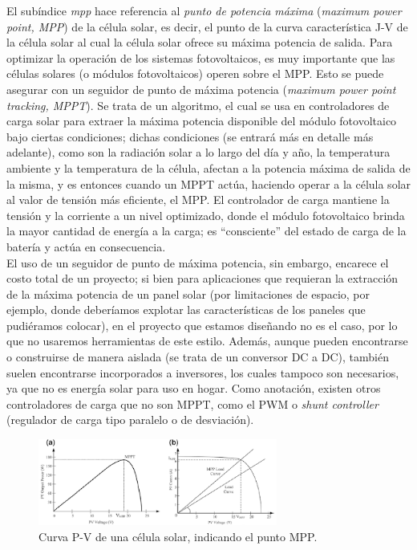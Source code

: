 \documentclass[12pt]{article}
\begin{document}
	\noindent El subíndice \textit{mpp} hace referencia al \textit{punto de potencia máxima} (\textit{maximum power point, MPP}) de la célula solar, es decir, el punto de la curva característica J-V de la célula solar al cual la célula solar ofrece su máxima potencia de salida.  Para optimizar la operación de los sistemas fotovoltaicos, es muy importante que las células solares (o módulos fotovoltaicos) operen sobre el MPP. Esto se puede asegurar con un seguidor de punto de máxima potencia (\textit{maximum power point tracking, MPPT}). Se trata de un algoritmo, el cual se usa en controladores de carga solar para extraer la máxima potencia disponible del módulo fotovoltaico bajo ciertas condiciones; dichas condiciones (se entrará más en detalle más adelante), como son la radiación solar a lo largo del día y año, la temperatura ambiente y la temperatura de la célula, afectan a la potencia máxima de salida de la misma, y es entonces cuando un MPPT actúa, haciendo operar a la célula solar al valor de tensión más eficiente, el MPP. El controlador de carga mantiene la tensión y la corriente a un nivel optimizado, donde el módulo fotovoltaico brinda la mayor cantidad de energía a la carga; es ``consciente'' del estado de carga de la batería y actúa en consecuencia. \\
	
	\noindent El uso de un seguidor de punto de máxima potencia, sin embargo, encarece el costo total de un proyecto; si bien para aplicaciones que requieran la extracción de la máxima potencia de un panel solar (por limitaciones de espacio, por ejemplo, donde deberíamos explotar las características de los paneles que pudiéramos colocar), en el proyecto que estamos diseñando no es el caso, por lo que no usaremos herramientas de este estilo. Además, aunque pueden encontrarse o construirse de manera aislada (se trata de un conversor DC a DC), también suelen encontrarse incorporados a inversores, los cuales tampoco son necesarios, ya que no es energía solar para uso en hogar. Como anotación, existen otros controladores de carga que no son MPPT, como el PWM o \textit{shunt controller} (regulador de carga tipo paralelo o de desviación). \\
	
	\begin{figure}[h]
		\begin{center}
			\includegraphics[width=0.7\textwidth]{img/mppt_curve.png}
			\caption{Curva P-V de una célula solar, indicando el punto MPP.}
			\label{fig: MPPT in P-V curve of a solar cell}
		\end{center}
	\end{figure}
	
\end{document}
